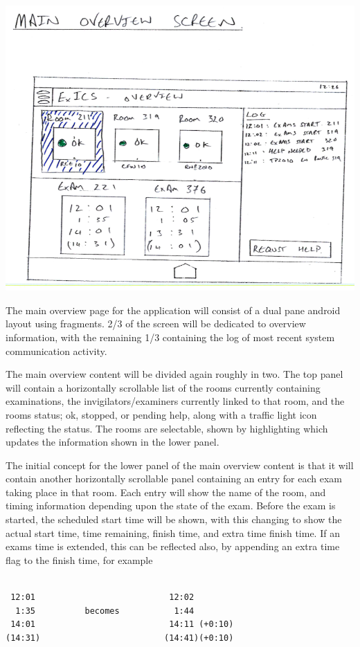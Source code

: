 \documentclass[a4paper, 12pt, notitlepage]{report}
\begin{document}
\includegraphics[width=\textwidth]{"GUI Sketches/Main Overview Cropped"}

The main overview page for the application will consist of a dual pane android layout using fragments.  2/3 of the screen will be dedicated to overview information, with the remaining 1/3 containing the log of most recent system communication activity.

The main overview content will be divided again roughly in two.  The top panel will contain a horizontally scrollable list of the rooms currently containing examinations, the invigilators/examiners currently linked to that room, and the rooms status; ok, stopped, or pending help, along with a traffic light icon reflecting the status.  The rooms are selectable, shown by highlighting which updates the information shown in the lower panel.

The initial concept for the lower panel of the main overview content is that it will contain another horizontally scrollable panel containing an entry for each exam taking place in that room.  Each entry will show the name of the room, and timing information depending upon the state of the exam.  Before the exam is started, the scheduled start time will be shown, with this changing to show the actual start time, time remaining, finish time, and extra time finish time.  If an exams time is extended, this can be reflected also, by appending an extra time flag to the finish time, for example

\begin{minipage}{\textwidth}
\begin{lstlisting}[captionpos=b,caption=Representation of Examination Timings, tabsize=4, breaklines=true]

 12:01							 12:02
  1:35			becomes			  1:44
 14:01							 14:11 (+0:10)
(14:31)							(14:41)(+0:10)

\end{lstlisting}
\end{minipage}
\end{document}
